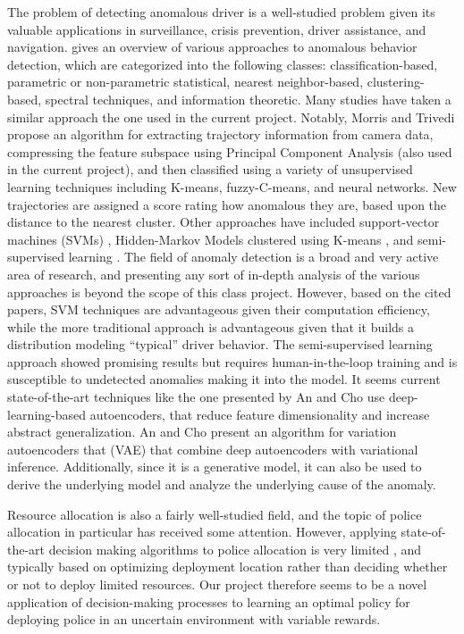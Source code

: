 \documentclass[10pt,journal]{IEEEtran}
\begin{document}
The problem of detecting anomalous driver is a well-studied problem given its valuable applications in surveillance, crisis prevention, driver assistance, and navigation. \cite{chandola2009anomaly} gives an overview of various approaches to anomalous behavior detection, which are categorized into the following classes: classification-based, parametric or non-parametric statistical, nearest neighbor-based, clustering-based, spectral techniques, and information theoretic. Many studies have taken a similar approach the one used in the current project. Notably, Morris and Trivedi \cite{morris2008survey} propose an algorithm for extracting trajectory information from camera data, compressing the feature subspace using Principal Component Analysis (also used in the current project), and then classified using a variety of unsupervised learning techniques including K-means, fuzzy-C-means, and neural networks. New trajectories are assigned a score rating how anomalous they are, based upon the distance to the nearest cluster. Other approaches have included support-vector machines (SVMs) \cite{piciarelli2008trajectory}, Hidden-Markov Models clustered using K-means \cite{suzuki2007learning}, and semi-supervised learning \cite{sillito2008semi}. The field of anomaly detection is a broad and very active area of research, and presenting any sort of in-depth analysis of the various approaches is beyond the scope of this class project. However, based on the cited papers, SVM techniques are advantageous given their computation efficiency, while the more traditional approach is advantageous given that it builds a distribution modeling ``typical'' driver behavior. The semi-supervised learning approach showed promising results but requires human-in-the-loop training and is susceptible to undetected anomalies making it into the model. It seems current state-of-the-art techniques like the one presented by An and Cho \cite{an2015variational} use deep-learning-based autoencoders, that reduce feature dimensionality and increase abstract generalization. An and Cho present an algorithm for variation autoencoders that (VAE) that combine deep autoencoders with variational inference. Additionally, since it is a generative model, it can also be used to derive the underlying model and analyze the underlying cause of the anomaly.

Resource allocation is also a fairly well-studied field, and the topic of police allocation in particular has received some attention. However, applying state-of-the-art decision making algorithms to police allocation is very limited \cite{locationallocation}, and typically based on optimizing deployment location rather than deciding whether or not to deploy limited resources. Our project therefore seems to be a novel application of decision-making processes to learning an optimal policy for deploying police in an uncertain environment with variable rewards. 
\end{document}
